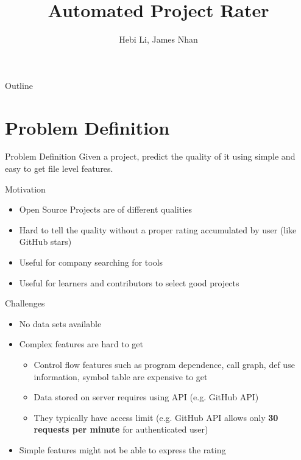 \documentclass[presentation]{beamer}
\author{Hebi Li, James Nhan}
\title{Automated Project Rater}
\begin{document}
\maketitle


\begin{frame}{Outline}
\tableofcontents
\end{frame}


\section{Problem Definition}
\begin{frame}{Problem Definition}
  Given a project, predict the quality of it using simple and easy to
  get file level features.
\end{frame}


\begin{frame}{Motivation}
\begin{itemize}
\item Open Source Projects are of different qualities
\item Hard to tell the quality without a proper rating accumulated by
  user (like GitHub stars)
\item Useful for company searching for tools
\item Useful for learners and contributors to select good projects
\end{itemize}
\end{frame}

\begin{frame}{Challenges}
  \begin{itemize}
  \item No data sets available
  \item Complex features are hard to get
    \begin{itemize}
    \item Control flow features such as program dependence, call graph,
      def use information, symbol table are expensive to get
    \item Data stored on server requires using API (e.g. GitHub API)
    \item They typically have access limit (e.g. GitHub API allows only
      \textbf{30 requests per minute} for authenticated user)
    \end{itemize}
  \item Simple features might not be able to express the rating
  \end{itemize}
\end{frame}
\end{document}
